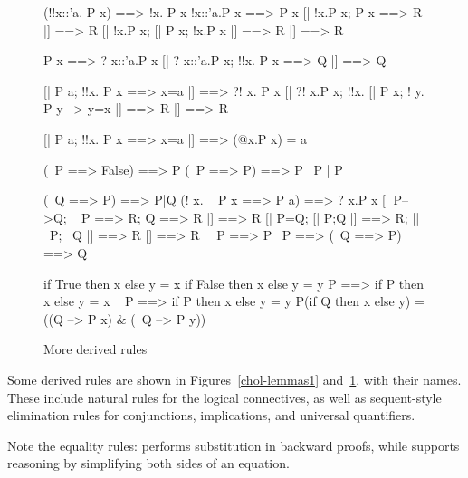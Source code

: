 \begin{figure}
\begin{ttbox}\makeatother
{}      (!!x::'a. P x) ==> !x. P x
      !x::'a.P x ==> P x
      [| !x.P x;  P x ==> R |] ==> R
  [| !x.P x;  [| P x; !x.P x |] ==> R |] ==> R

       P x ==> ? x::'a.P x
       [| ? x::'a.P x; !!x. P x ==> Q |] ==> Q

      [| P a;  !!x. P x ==> x=a |] ==> ?! x. P x
      [| ?! x.P x;  !!x. [| P x;  ! y. P y --> y=x |] ==> R 
          |] ==> R

 [| P a;  !!x. P x ==> x=a |] ==> (@x.P x) = a

          (~P ==> False) ==> P
       (~P ==> P) ==> P
 ~P | P

          (~Q ==> P) ==> P|Q
            (! x. ~ P x ==> P a) ==> ? x.P x
           [| P-->Q; ~ P ==> R; Q ==> R |] ==> R
           [| P=Q;  [| P;Q |] ==> R;  [| ~P; ~Q |] ==> R |] ==> R
         ~~P ==> P
            ~P ==> (~Q ==> P) ==> Q

         if True then x else y = x
        if False then x else y = y
            P ==> if P then x else y = x
        ~ P ==> if P then x else y = y
       P(if Q then x else y) = ((Q --> P x) & (~Q --> P y))
\end{ttbox}
\caption{More derived rules} \label{chol-lemmas2}
\end{figure}


Some derived rules are shown in Figures~\ref{chol-lemmas1}
and~\ref{chol-lemmas2}, with their {\ML} names.  These include natural rules
for the logical connectives, as well as sequent-style elimination rules for
conjunctions, implications, and universal quantifiers.  

Note the equality rules:  performs substitution in
backward proofs, while  supports reasoning by
simplifying both sides of an equation.


